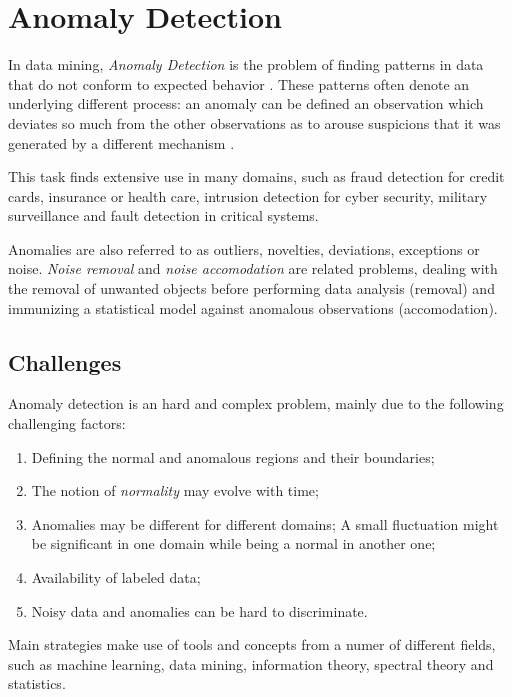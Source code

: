 \chapter{Anomaly Detection}

In data mining, \textit{Anomaly Detection} is the problem of finding patterns in data that do not conform to expected behavior \cite{chandola2009anomaly}. These patterns often denote an underlying different process: an anomaly can be defined an observation which deviates so much from the other observations as to arouse suspicions that it was generated by a different mechanism \cite{hawkins1980identification}.

This task finds extensive use in many domains, such as fraud detection for credit cards, insurance or health care, intrusion detection for cyber security, military surveillance and fault detection in critical systems.

Anomalies are also referred to as outliers, novelties, deviations, exceptions or noise. \textit{Noise removal} and \textit{noise accomodation} are related problems, dealing with the removal of unwanted objects before performing data analysis (removal) and immunizing a statistical model against anomalous observations (accomodation).

\section{Challenges}

Anomaly detection is an hard and complex problem, mainly due to the following challenging factors:

\begin{enumerate}
	\item Defining the normal and anomalous regions and their boundaries;
	\item The notion of \textit{normality} may evolve with time;
	\item Anomalies may be different for different domains; A small fluctuation might be significant in one domain while being a normal in another one;
	\item Availability of labeled data;
	\item Noisy data and anomalies can be hard to discriminate.
\end{enumerate}


Main strategies make use of tools and concepts from a numer of different fields, such as machine learning, data mining, information theory, spectral theory and statistics.